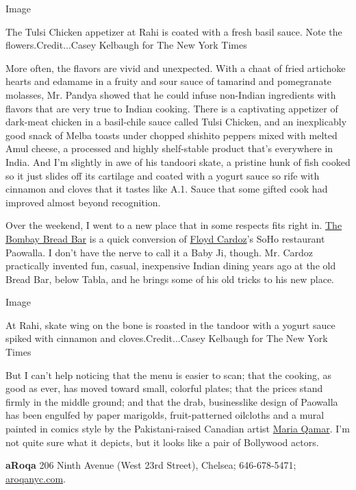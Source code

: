 Image

The Tulsi Chicken appetizer at Rahi is coated with a fresh basil sauce.
Note the flowers.Credit...Casey Kelbaugh for The New York Times

More often, the flavors are vivid and unexpected. With a chaat of fried
artichoke hearts and edamame in a fruity and sour sauce of tamarind and
pomegranate molasses, Mr. Pandya showed that he could infuse non-Indian
ingredients with flavors that are very true to Indian cooking. There is
a captivating appetizer of dark-meat chicken in a basil-chile sauce
called Tulsi Chicken, and an inexplicably good snack of Melba toasts
under chopped shishito peppers mixed with melted Amul cheese, a
processed and highly shelf-stable product that's everywhere in India.
And I'm slightly in awe of his tandoori skate, a pristine hunk of fish
cooked so it just slides off its cartilage and coated with a yogurt
sauce so rife with cinnamon and cloves that it tastes like A.1. Sauce
that some gifted cook had improved almost beyond recognition.

Over the weekend, I went to a new place that in some respects fits right
in. \href{https://www.thebombaybreadbar.com/}{The Bombay Bread Bar} is a
quick conversion of
\href{https://www.nytimes3xbfgragh.onion/2018/02/15/dining/floyd-cardoz-paowalla-closing-bombay-bread-bar.html}{Floyd
Cardoz}'s SoHo restaurant Paowalla. I don't have the nerve to call it a
Baby Ji, though. Mr. Cardoz practically invented fun, casual,
inexpensive Indian dining years ago at the old Bread Bar, below Tabla,
and he brings some of his old tricks to his new place.

Image

At Rahi, skate wing on the bone is roasted in the tandoor with a yogurt
sauce spiked with cinnamon and cloves.Credit...Casey Kelbaugh for The
New York Times

But I can't help noticing that the menu is easier to scan; that the
cooking, as good as ever, has moved toward small, colorful plates; that
the prices stand firmly in the middle ground; and that the drab,
businesslike design of Paowalla has been engulfed by paper marigolds,
fruit-patterned oilcloths and a mural painted in comics style by the
Pakistani-raised Canadian artist
\href{https://www.thestar.com/entertainment/books/2017/08/01/they-gave-her-bad-advice-toronto-artist-maria-qamar-turned-it-into-a-book-trust-no-aunty.html}{Maria
Qamar}. I'm not quite sure what it depicts, but it looks like a pair of
Bollywood actors.

\textbf{aRoqa} 206 Ninth Avenue (West 23rd Street), Chelsea;
646-678-5471; \href{https://www.aroqanyc.com/}{aroqanyc.com}.

